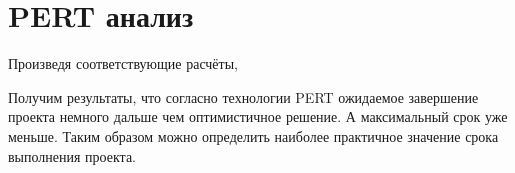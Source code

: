 \section{PERT анализ}
Произведя соответствующие расчёты,


Получим результаты,
	что согласно технологии PERT ожидаемое завершение проекта немного дальше чем оптимистичное решение.
А максимальный срок уже меньше.
Таким образом можно определить наиболее практичное значение срока выполнения проекта.
